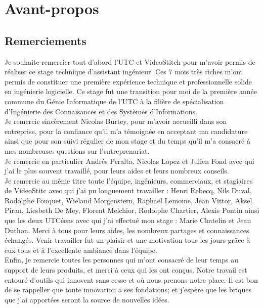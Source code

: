 \chapter*{Avant-propos}

\section*{Remerciements}
Je souhaite remercier tout d'abord l'UTC et VideoStitch pour m'avoir permis de 
réaliser ce stage technique d'assistant ingénieur. Ces 7 mois très riches m'ont 
permis de constituer une première expérience technique et professionnelle solide 
en ingénierie logicielle. Ce stage fut une transition pour moi de la première 
année commune du Génie Informatique de l'UTC à la filière de spécialisation 
d'Ingénierie des Connaisances et des Systèmes d'Informations.\\
\newline
Je remercie sincèrement Nicolas Burtey, pour m'avoir accueilli dans son entreprise,
pour la confiance qu'il m'a témoignée en acceptant ma candidature ainsi que pour
son suivi régulier de mon stage et du temps qu'il m'a consacré à mes nombreuses
questions sur l'entreprenariat.\\
Je remercie en particulier Andrés Peralta, Nicolas Lopez et Julien Fond avec qui 
j'ai le plus souvent travaillé, pour leurs aides et leurs nombreux conseils.\\
Je remercie au même titre toute l'équipe, ingénieurs, commerciaux, et stagiaires 
de VideoStitc avec qui j'ai pu longuement travailler :
Henri Rebecq, Nils Duval, Rodolphe Fouquet, Wieland Morgenstern, Raphaël 
Lemoine, Jean Vittor, Aksel Piran, Liesbeth De Mey, Florent Melchior, Rodolphe 
Chartier, Alexis Pontin ainsi que les deux UTCéens avec qui j'ai effectué mon 
stage : Marie Chatelin et Jean Duthon. Merci à tous pour leurs aides, 
les nombreux partages et connaissances échangés. Venir travailler fut un plaisir 
et une motivation tous les jours grâce à eux tous et à l'excellente ambiance dans l'équipe.\\
\newline
Enfin, je remercie toutes les personnes qui m'ont consacré de leur temps au support 
de leurs produits, et merci à ceux qui les ont conçus. Notre travail est entouré 
d'outils qui innovent sans cesse et où nous prenons notre place. Il est bon de 
se rappeller que toute innovation a ses fondations; et j'espère que les briques 
que j'ai apportées seront la source de nouvelles idées.

